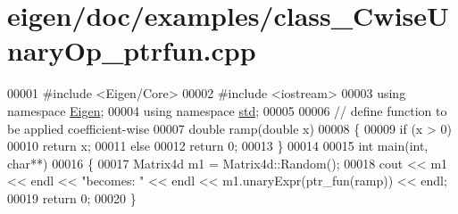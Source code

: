 \hypertarget{eigen_2doc_2examples_2class___cwise_unary_op__ptrfun_8cpp_source}{}\section{eigen/doc/examples/class\+\_\+\+Cwise\+Unary\+Op\+\_\+ptrfun.cpp}
\label{eigen_2doc_2examples_2class___cwise_unary_op__ptrfun_8cpp_source}

\begin{DoxyCode}
00001 \textcolor{preprocessor}{#include <Eigen/Core>}
00002 \textcolor{preprocessor}{#include <iostream>}
00003 \textcolor{keyword}{using namespace }\hyperlink{namespace_eigen}{Eigen};
00004 \textcolor{keyword}{using namespace }\hyperlink{namespacestd}{std};
00005 
00006 \textcolor{comment}{// define function to be applied coefficient-wise}
00007 \textcolor{keywordtype}{double} ramp(\textcolor{keywordtype}{double} x)
00008 \{
00009   \textcolor{keywordflow}{if} (x > 0)
00010     \textcolor{keywordflow}{return} x;
00011   \textcolor{keywordflow}{else} 
00012     \textcolor{keywordflow}{return} 0;
00013 \}
00014 
00015 \textcolor{keywordtype}{int} main(\textcolor{keywordtype}{int}, \textcolor{keywordtype}{char}**)
00016 \{
00017   Matrix4d m1 = Matrix4d::Random();
00018   cout << m1 << endl << \textcolor{stringliteral}{"becomes: "} << endl << m1.unaryExpr(ptr\_fun(ramp)) << endl;
00019   \textcolor{keywordflow}{return} 0;
00020 \}
\end{DoxyCode}
